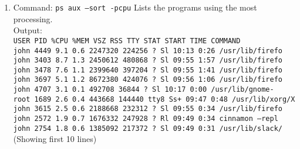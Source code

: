 \documentclass[11pt]{article}
\begin{document}
\begin{enumerate}
{}
\item Command:  {\tt ps aux --sort -pcpu} \hspace{1cm} Lists the programs using the most processing. \\
Output:  \\
{\tt USER       PID \%CPU \%MEM    VSZ   RSS TTY      STAT START   TIME COMMAND\\
john      4449  9.1  0.6 2247320 224256 ?      Sl   10:13   0:26 /usr/lib/firefo\\
john      3403  8.7  1.3 2450612 480868 ?      Sl   09:55   1:57 /usr/lib/firefo\\
john      3478  7.6  1.1 2399640 397204 ?      Sl   09:55   1:41 /usr/lib/firefo\\
john      3697  5.1  1.2 8672380 424076 ?      Sl   09:56   1:06 /usr/lib/firefo\\
john      4707  3.1  0.1 492708 36844 ?        Sl   10:17   0:00 /usr/lib/gnome-\\
root      1689  2.6  0.4 443668 144440 tty8    Ss+  09:47   0:48 /usr/lib/xorg/X\\
john      3615  2.5  0.6 2188668 232312 ?      Sl   09:55   0:34 /usr/lib/firefo\\
john      2572  1.9  0.7 1676332 247928 ?      Rl   09:49   0:34 cinnamon --repl\\
john      2754  1.8  0.6 1385092 217372 ?      Sl   09:49   0:31 /usr/lib/slack/} \\
(Showing first 10 lines)


\end{enumerate}
\end{document}
